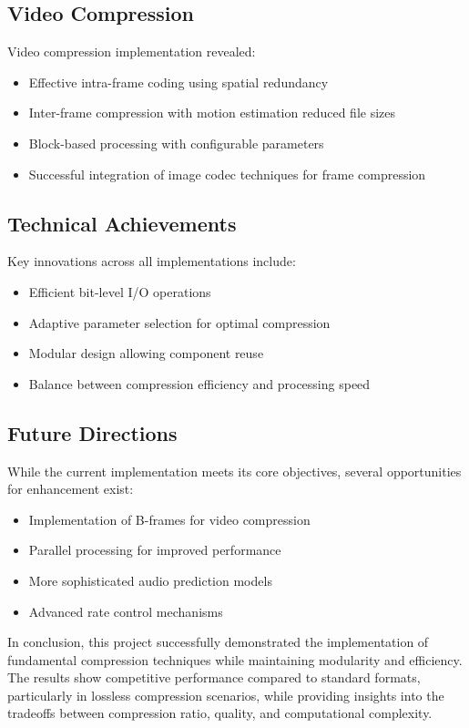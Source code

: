 \documentclass[a4paper,14pt]{article}
\begin{document}
\subsection{Video Compression}
Video compression implementation revealed:
\begin{itemize}
    \item Effective intra-frame coding using spatial redundancy
    \item Inter-frame compression with motion estimation reduced file sizes
    \item Block-based processing with configurable parameters
    \item Successful integration of image codec techniques for frame compression
\end{itemize}

\subsection{Technical Achievements}
Key innovations across all implementations include:
\begin{itemize}
    \item Efficient bit-level I/O operations
    \item Adaptive parameter selection for optimal compression
    \item Modular design allowing component reuse
    \item Balance between compression efficiency and processing speed
\end{itemize}

\subsection{Future Directions}
While the current implementation meets its core objectives, several opportunities for enhancement exist:
\begin{itemize}
    \item Implementation of B-frames for video compression
    \item Parallel processing for improved performance
    \item More sophisticated audio prediction models
    \item Advanced rate control mechanisms
\end{itemize}

In conclusion, this project successfully demonstrated the implementation of fundamental compression techniques while maintaining modularity and efficiency. The results show competitive performance compared to standard formats, particularly in lossless compression scenarios, while providing insights into the tradeoffs between compression ratio, quality, and computational complexity.
\end{document}
